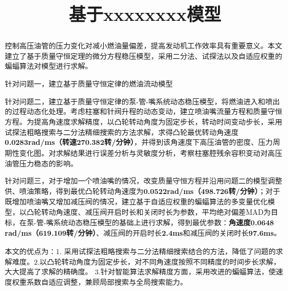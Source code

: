 \documentclass{whutmod}
\title{基于xxxxxxxx模型}
\begin{document}
	\maketitle
	\thispagestyle{empty}
	\begin{abstract}
		控制高压油管的压力变化对减小燃油量偏差，提高发动机工作效率具有重要意义。本文建立了基于质量守恒定理的微分方程稳压模型，采用二分法、试探法以及自适应权重的蝙蝠算法对模型进行求解。
		\vspace{6pt}	%


		针对问题一，建立基于质量守恒定律的燃油流动模型
		
		\vspace{6pt}	%
		

	
		针对问题二，建立基于质量守恒定律的泵-管-嘴系统动态稳压模型，将燃油进入和喷出的过程动态化处理。考虑柱塞和针阀升程的动态变动，建立喷油嘴流量方程和质量守恒方程。为提高角速度求解精度，以凸轮转动角度为固定步长，转动时间变动步长，采用试探法粗略搜索与二分法精细搜索的方法求解，求得凸轮最优转动角速度\textbf{0.0283rad/ms（转速270.382转/分钟）}，并得到该角速度下高压油管的密度、压力周期性变化图。对求解结果进行误差分析与灵敏度分析，考察柱塞腔残余容积变动对高压油管压力稳态的影响。
		\vspace{6pt}	%
	
		针对问题三，对于增加一个喷油嘴的情况，改变质量守恒方程并沿用问题二的模型调整供、喷油策略，得到最优凸轮转动角速度为\textbf{0.0522rad/ms（498.726转/分钟）}；对于既增加喷油嘴又增加减压阀的情况，建立基于自适应权重的蝙蝠算法的多变量优化模型，以凸轮转动角速度、减压阀开启时长和关闭时长为参数，平均绝对偏差MAD为目标，在泵-管-嘴系统动态稳压模型的基础上进行求解，得到最优参数：\textbf{角速度0.0648 rad/ms（619.109转/分钟）}、减压阀的开启时长\textbf{2.4ms}和减压阀的关闭时长\textbf{97.6ms}。
		\vspace{6pt}	%
	
		本文的优点为：1. 采用试探法粗略搜索与二分法精细搜索结合的方法，降低了问题的求解难度。2.以凸轮转动角度为固定步长，对不同角速度按照不同精度的时间步长求解，大大提高了求解的精确度。 3.针对智能算法求解精度方面，采用改进的蝙蝠算法，使速度权重系数自适应调整，兼顾局部搜索与全局搜索能力。
		
	\end{abstract}
\end{document}
